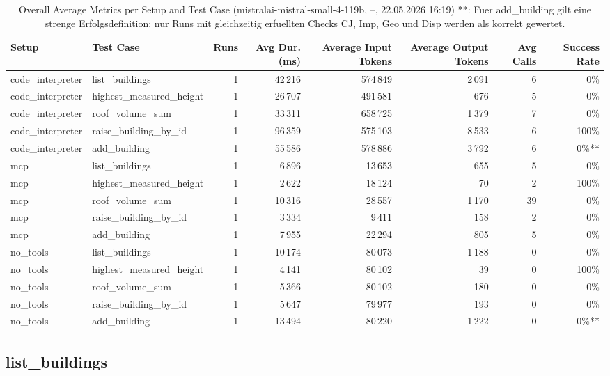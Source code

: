 \documentclass[a4paper,11pt]{article}
\begin{document}
\begin{table}[H]
\centering
\scriptsize
\caption{Overall Average Metrics per Setup and Test Case (mistralai-mistral-small-4-119b, --, 22.05.2026 16:19) **: Fuer add\_building gilt eine strenge Erfolgsdefinition: nur Runs mit gleichzeitig erfuellten Checks CJ, Imp, Geo und Disp werden als korrekt gewertet.}
\begin{tabular}{l l r r r r r r}
\toprule
Setup & Test Case & Runs & Avg Dur. (ms) & Average Input Tokens & Average Output Tokens & Avg Calls & Success Rate \\
\midrule
code\_interpreter & list\_buildings & 1 & 42\,216 & 574\,849 & 2\,091 & 6 & 0\% \\
code\_interpreter & highest\_measured\_height & 1 & 26\,707 & 491\,581 & 676 & 5 & 0\% \\
code\_interpreter & roof\_volume\_sum & 1 & 33\,311 & 658\,725 & 1\,379 & 7 & 0\% \\
code\_interpreter & raise\_building\_by\_id & 1 & 96\,359 & 575\,103 & 8\,533 & 6 & 100\% \\
code\_interpreter & add\_building & 1 & 55\,586 & 578\,886 & 3\,792 & 6 & 0\%** \\
\midrule
mcp & list\_buildings & 1 & 6\,896 & 13\,653 & 655 & 5 & 0\% \\
mcp & highest\_measured\_height & 1 & 2\,622 & 18\,124 & 70 & 2 & 100\% \\
mcp & roof\_volume\_sum & 1 & 10\,316 & 28\,557 & 1\,170 & 39 & 0\% \\
mcp & raise\_building\_by\_id & 1 & 3\,334 & 9\,411 & 158 & 2 & 0\% \\
mcp & add\_building & 1 & 7\,955 & 22\,294 & 805 & 5 & 0\% \\
\midrule
no\_tools & list\_buildings & 1 & 10\,174 & 80\,073 & 1\,188 & 0 & 0\% \\
no\_tools & highest\_measured\_height & 1 & 4\,141 & 80\,102 & 39 & 0 & 100\% \\
no\_tools & roof\_volume\_sum & 1 & 5\,366 & 80\,102 & 180 & 0 & 0\% \\
no\_tools & raise\_building\_by\_id & 1 & 5\,647 & 79\,977 & 193 & 0 & 0\% \\
no\_tools & add\_building & 1 & 13\,494 & 80\,220 & 1\,222 & 0 & 0\%** \\
\bottomrule
\end{tabular}
\end{table}

\clearpage

\subsection{list\_buildings}
\end{document}
